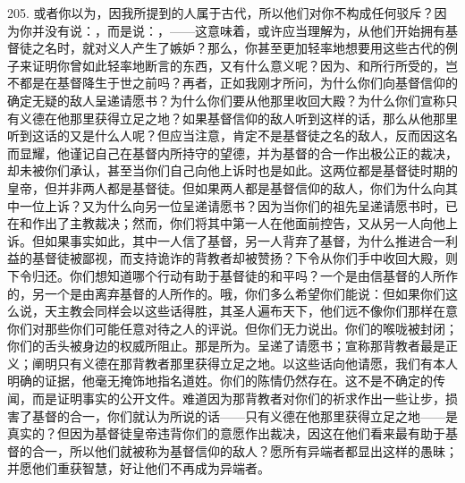 205. 或者你以为，因我所提到的人属于古代，所以他们对你不构成任何驳斥？因为你并没有说：，而是说：，——这意味着，或许应当理解为，从他们开始拥有基督徒之名时，就对义人产生了嫉妒？那么，你甚至更加轻率地想要用这些古代的例子来证明你曾如此轻率地断言的东西，又有什么意义呢？因为、和所行所受的，岂不都是在基督降生于世之前吗？再者，正如我刚才所问，为什么你们向基督信仰的确定无疑的敌人呈递请愿书？为什么你们要从他那里收回大殿？为什么你们宣称只有义德在他那里获得立足之地？如果基督信仰的敌人听到这样的话，那么从他那里听到这话的又是什么人呢？但应当注意，肯定不是基督徒之名的敌人，反而因这名而显耀，他谨记自己在基督内所持守的望德，并为基督的合一作出极公正的裁决，却未被你们承认，甚至当你们自己向他上诉时也是如此。这两位都是基督徒时期的皇帝，但并非两人都是基督徒。但如果两人都是基督信仰的敌人，你们为什么向其中一位上诉？又为什么向另一位呈递请愿书？因为当你们的祖先呈递请愿书时，已在和作出了主教裁决；然而，你们将其中第一人在他面前控告，又从另一人向他上诉。但如果事实如此，其中一人信了基督，另一人背弃了基督，为什么推进合一利益的基督徒被鄙视，而支持诡诈的背教者却被赞扬？下令从你们手中收回大殿，则下令归还。你们想知道哪个行动有助于基督徒的和平吗？一个是由信基督的人所作的，另一个是由离弃基督的人所作的。哦，你们多么希望你们能说：但如果你们这么说，天主教会同样会以这些话得胜，其圣人遍布天下，他们远不像你们那样在意你们对那些你们可能任意对待之人的评说。但你们无力说出。你们的喉咙被封闭；你们的舌头被身边的权威所阻止。那是所为。呈递了请愿书；宣称那背教者最是正义；阐明只有义德在那背教者那里获得立足之地。以这些话向他请愿，我们有本人明确的证据，他毫无掩饰地指名道姓。你们的陈情仍然存在。这不是不确定的传闻，而是证明事实的公开文件。难道因为那背教者对你们的祈求作出一些让步，损害了基督的合一，你们就认为所说的话——只有义德在他那里获得立足之地——是真实的？但因为基督徒皇帝违背你们的意愿作出裁决，因这在他们看来最有助于基督的合一，所以他们就被称为基督信仰的敌人？愿所有异端者都显出这样的愚昧；并愿他们重获智慧，好让他们不再成为异端者。\par

